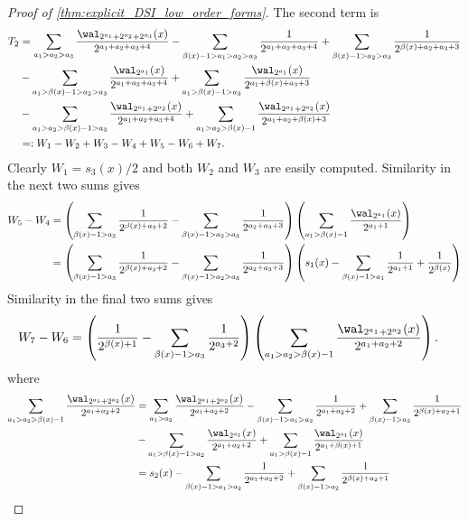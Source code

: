 \documentclass[acmsmall]{acmart}
\begin{document}
\begin{proof}[Proof of \cref{thm:explicit_DSI_low_order_forms}]
    The second term is 
    \begin{align*}
        T_2 &= \sum_{a_1>a_2>a_3} \frac{\wal_{2^{a_1}+2^{a_2}+2^{a_3}}(x)}{2^{a_1+a_2+a_3+4}} - \sum_{\beta(x)-1 > a_1 > a_2 > a_3} \frac{1}{2^{a_1+a_2+a_3+4}} + \sum_{\beta(x)-1 > a_2 > a_3} \frac{1}{2^{\beta(x)+a_2+a_3+3}} \\ & - \sum_{a_1 > \beta(x)-1 > a_2 > a_3} \frac{\wal_{2^{a_1}}(x)}{2^{a_1+a_2+a_3+4}} + \sum_{a_1 > \beta(x)-1 > a_3}  \frac{\wal_{2^{a_1}}(x)}{2^{a_1+\beta(x)+a_3+3}} \\ &- \sum_{a_1 > a_2 > \beta(x)-1 > a_3}\frac{\wal_{2^{a_1}+2^{a_2}}(x)}{2^{a_1+a_2+a_3+4}} + \sum_{a_1 > a_2 > \beta(x)-1} \frac{\wal_{2^{a_1}+2^{a_2}}(x)}{2^{a_1+a_2+\beta(x)+3}} \\
        &=: W_1-W_2+W_3-W_4+W_5-W_6+W_7.
    \end{align*}
    Clearly $W_1 = s_3(x)/2$ and both $W_2$ and $W_3$ are easily computed. Similarity in the next two sums gives
    \begin{align*}
        W_5 - W_4 &= \left(\sum_{\beta(x)-1 > a_3}\frac{1}{2^{\beta(x)+a_3+2}}-\sum_{\beta(x)-1>a_2>a_3} \frac{1}{2^{a_2+a_3+3}}\right) \left(\sum_{a_1 > \beta(x)-1} \frac{\wal_{2^{a_1}}(x)}{2^{a_1+1}} \right) \\
        &= \left(\sum_{\beta(x)-1 > a_3}\frac{1}{2^{\beta(x)+a_3+2}}-\sum_{\beta(x)-1>a_2>a_3} \frac{1}{2^{a_2+a_3+3}}\right)\left(s_1(x) - \sum_{\beta(x)-1 > a_1} \frac{1}{2^{a_1+1}} + \frac{1}{2^{\beta(x)}}\right)
    \end{align*}
    Similarity in the final two sums gives  
    \begin{align*}
        W_7 - W_6 &= \left(\frac{1}{2^{\beta(x)+1}}-\sum_{\beta(x)-1 > a_3} \frac{1}{2^{a_3+2}}\right) \left(\sum_{a_1>a_2 > \beta(x)-1} \frac{\wal_{2^{a_1}+2^{a_2}}(x)}{2^{a_1+a_2+2}}\right).
    \end{align*}
    where 
    \begin{align*}
        \sum_{a_1>a_2 > \beta(x)-1} \frac{\wal_{2^{a_1}+2^{a_2}}(x)}{2^{a_1+a_2+2}} &= \sum_{a_1>a_2} \frac{\wal_{2^{a_1}+2^{a_2}}(x)}{2^{a_1+a_2+2}} - \sum_{\beta(x)-1 > a_1 > a_2} \frac{1}{2^{a_1+a_2+2}} + \sum_{\beta(x)-1 > a_2} \frac{1}{2^{\beta(x)+a_2+1}} \\ &- \sum_{a_1 > \beta(x)-1 > a_2} \frac{\wal_{2^{a_1}}(x)}{2^{a_1+a_2+2}} + \sum_{a_1 > \beta(x)-1} \frac{\wal_{2^{a_1}}(x)}{2^{a_1+\beta(x)+1}} \\
        &= s_2(x) - \sum_{\beta(x)-1 > a_1 > a_2} \frac{1}{2^{a_1+a_2+2}} + \sum_{\beta(x)-1 > a_2} \frac{1}{2^{\beta(x)+a_2+1}}\\

\end{align*}
\end{proof}
\end{document}
